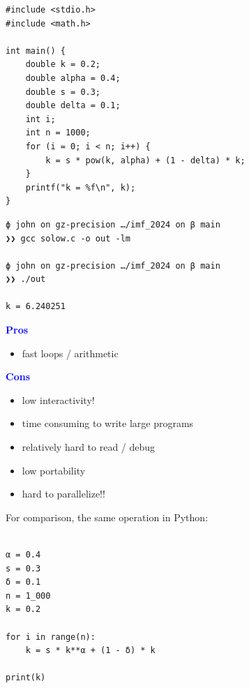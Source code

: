\documentclass[
    xcolor={svgnames,dvipsnames},
    hyperref={colorlinks, citecolor=DeepPink4, linkcolor=DarkRed, urlcolor=DarkBlue}
    ]{beamer}  %
\newcommand{\navy}[1]{\textcolor{Blue}{\bf #1}}
\newcommand{\1}{\mathbbm 1}
\begin{document}
\begin{frame}[fragile]
    
    \begin{verbatim}
#include <stdio.h>
#include <math.h>

int main() {
    double k = 0.2;
    double alpha = 0.4;
    double s = 0.3;
    double delta = 0.1;
    int i;
    int n = 1000;
    for (i = 0; i < n; i++) {
        k = s * pow(k, alpha) + (1 - delta) * k;
    }
    printf("k = %f\n", k);
}
    \end{verbatim}

\end{frame}



\begin{frame}[fragile]
    
    \begin{verbatim}
ϕ john on gz-precision …/imf_2024 on β main
❯❯ gcc solow.c -o out -lm

ϕ john on gz-precision …/imf_2024 on β main
❯❯ ./out 

k = 6.240251
    \end{verbatim}

\end{frame}

\begin{frame}

    \navy{Pros}

    \begin{itemize}
        \item fast loops / arithmetic
    \end{itemize}


    \vspace{0.5em}

    \navy{Cons}

    \begin{itemize}
        \item low interactivity!
        \item time consuming to write large programs
        \item relatively hard to read / debug
        \item low portability
        \item hard to parallelize!!
    \end{itemize}

\end{frame}




\begin{frame}[fragile]

    For comparison, the same operation in Python:
    
    \begin{verbatim}

α = 0.4
s = 0.3
δ = 0.1
n = 1_000
k = 0.2

for i in range(n):
    k = s * k**α + (1 - δ) * k

print(k)

    \end{verbatim}

\end{frame}
\end{document}
